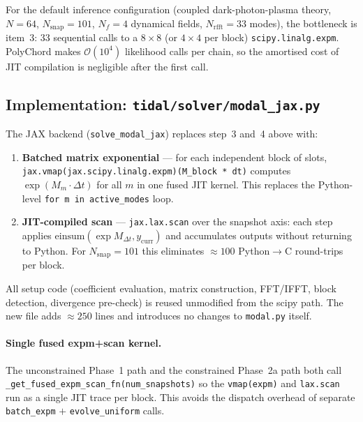 For the default inference configuration (coupled dark-photon-plasma theory,
$N=64$, $N_{\mathrm{snap}}=101$, $N_f=4$ dynamical fields, $N_{\mathrm{rfft}}
= 33$ modes), the bottleneck is item~3: 33 sequential calls to a $8\times8$
(or $4\times4$ per block) \texttt{scipy.linalg.expm}.  PolyChord makes
$\mathcal{O}(10^4)$ likelihood calls per chain, so the amortised cost of
JIT compilation is negligible after the first call.

\subsection{Implementation: \texttt{tidal/solver/modal\_jax.py}}
\label{sec:modal_jax_impl}

The JAX backend (\texttt{solve\_modal\_jax}) replaces step~3 and~4 above
with:

\begin{enumerate}
  \item \textbf{Batched matrix exponential} — for each independent block
    of slots, \texttt{jax.vmap(jax.scipy.linalg.expm)(M\_block * dt)}
    computes $\exp(M_m \cdot \Delta t)$ for all $m$ in one fused JIT kernel.
    This replaces the Python-level \texttt{for m in active\_modes} loop.

  \item \textbf{JIT-compiled scan} — \texttt{jax.lax.scan} over the snapshot
    axis: each step applies $\mathrm{einsum}(\exp M_{\Delta t}, y_{\mathrm{curr}})$
    and accumulates outputs without returning to Python.  For $N_{\mathrm{snap}}
    = 101$ this eliminates $\approx100$ Python$\to$C round-trips per block.
\end{enumerate}

All setup code (coefficient evaluation, matrix construction, FFT/IFFT, block
detection, divergence pre-check) is reused unmodified from the scipy path.
The new file adds $\approx250$ lines and introduces no changes to
\texttt{modal.py} itself.

\paragraph{Single fused expm+scan kernel.}  The unconstrained Phase~1 path
and the constrained Phase~2a path both call
\texttt{\_get\_fused\_expm\_scan\_fn(num\_snapshots)} so the
\texttt{vmap(expm)} and \texttt{lax.scan} run as a single JIT trace per
block.  This avoids the dispatch overhead of separate
\texttt{batch\_expm} $+$ \texttt{evolve\_uniform} calls.

